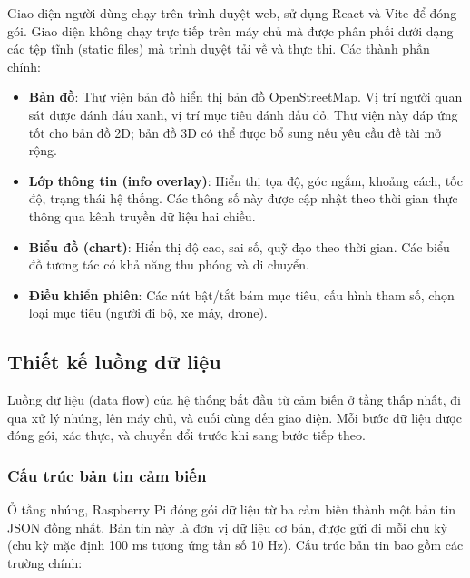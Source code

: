 \hspace{0.5cm} Giao diện người dùng chạy trên trình duyệt web, sử dụng React và Vite để đóng gói. Giao diện không chạy trực tiếp trên máy chủ mà được phân phối dưới dạng các tệp tĩnh (static files) mà trình duyệt tải về và thực thi. Các thành phần chính:

\begin{itemize}
    \item \textbf{Bản đồ}: Thư viện bản đồ hiển thị bản đồ OpenStreetMap. Vị trí người quan sát được đánh dấu xanh, vị trí mục tiêu đánh dấu đỏ. Thư viện này đáp ứng tốt cho bản đồ 2D; bản đồ 3D có thể được bổ sung nếu yêu cầu đề tài mở rộng.
    \item \textbf{Lớp thông tin (info overlay)}: Hiển thị tọa độ, góc ngắm, khoảng cách, tốc độ, trạng thái hệ thống. Các thông số này được cập nhật theo thời gian thực thông qua kênh truyền dữ liệu hai chiều.
    \item \textbf{Biểu đồ (chart)}: Hiển thị độ cao, sai số, quỹ đạo theo thời gian. Các biểu đồ tương tác có khả năng thu phóng và di chuyển.
    \item \textbf{Điều khiển phiên}: Các nút bật/tắt bám mục tiêu, cấu hình tham số, chọn loại mục tiêu (người đi bộ, xe máy, drone).
\end{itemize}

\subsection{Thiết kế luồng dữ liệu}

\hspace{0.5cm} Luồng dữ liệu (data flow) của hệ thống bắt đầu từ cảm biến ở tầng thấp nhất, đi qua xử lý nhúng, lên máy chủ, và cuối cùng đến giao diện. Mỗi bước dữ liệu được đóng gói, xác thực, và chuyển đổi trước khi sang bước tiếp theo.

\subsubsection{Cấu trúc bản tin cảm biến}

\hspace{0.5cm} Ở tầng nhúng, Raspberry Pi đóng gói dữ liệu từ ba cảm biến thành một bản tin JSON đồng nhất. Bản tin này là đơn vị dữ liệu cơ bản, được gửi đi mỗi chu kỳ (chu kỳ mặc định 100 ms tương ứng tần số 10 Hz). Cấu trúc bản tin bao gồm các trường chính:

